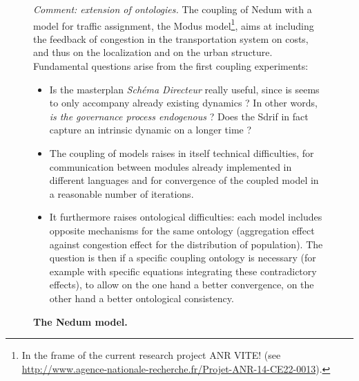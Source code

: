 \documentclass[galley]{jtlu-article-2col}
\begin{document}
\begin{figure}
\begin{mdframed}
	
	\textit{Comment: extension of ontologies.} The coupling of Nedum with a model for traffic assignment, the Modus model\footnote{In the frame of the current research project ANR VITE! (see \url{http://www.agence-nationale-recherche.fr/Projet-ANR-14-CE22-0013}).}, aims at including the feedback of congestion in the transportation system on costs, and thus on the localization and on the urban structure. Fundamental questions arise from the first coupling experiments:
	\begin{itemize}
		\item Is the masterplan \emph{Schéma Directeur} really useful, since is seems to only accompany already existing dynamics ? In other words, \textit{is the governance process endogenous} ? Does the Sdrif in fact capture an intrinsic dynamic on a longer time ?
		\item The coupling of models raises in itself technical difficulties, for communication between modules already implemented in different languages and for convergence of the coupled model in a reasonable number of iterations.
		\item It furthermore raises ontological difficulties: each model includes opposite mechanisms for the same ontology (aggregation effect against congestion effect for the distribution of population). The question is then if a specific coupling ontology is necessary (for example with specific equations integrating these contradictory effects), to allow on the one hand a better convergence, on the other hand a better ontological consistency.
	\end{itemize}
	
		
	
	
	\medskip
	
	\textbf{The Nedum model.}\label{frame:modelingsa:nedum}	
	\end{mdframed}
\end{figure}
\end{document}

